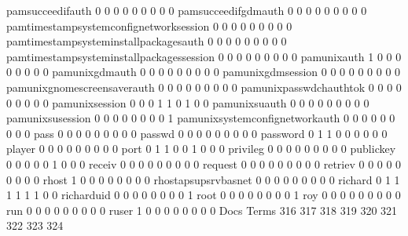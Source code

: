\documentclass[compress,8pt]{beamer}
\begin{document}
\begin{frame}
\begin{Schunk}
  pamsucceedifauth                           0   0   0   0   0   0   0   0   0
  pamsucceedifgdmauth                        0   0   0   0   0   0   0   0   0
  pamtimestampsystemconfignetworksession     0   0   0   0   0   0   0   0   0
  pamtimestampsysteminstallpackagesauth      0   0   0   0   0   0   0   0   0
  pamtimestampsysteminstallpackagessession   0   0   0   0   0   0   0   0   0
  pamunixauth                                1   0   0   0   0   0   0   0   0
  pamunixgdmauth                             0   0   0   0   0   0   0   0   0
  pamunixgdmsession                          0   0   0   0   0   0   0   0   0
  pamunixgnomescreensaverauth                0   0   0   0   0   0   0   0   0
  pamunixpasswdchauthtok                     0   0   0   0   0   0   0   0   0
  pamunixsession                             0   0   0   1   1   0   1   0   0
  pamunixsuauth                              0   0   0   0   0   0   0   0   0
  pamunixsusession                           0   0   0   0   0   0   0   0   1
  pamunixsystemconfignetworkauth             0   0   0   0   0   0   0   0   0
  pass                                       0   0   0   0   0   0   0   0   0
  passwd                                     0   0   0   0   0   0   0   0   0
  password                                   0   1   1   0   0   0   0   0   0
  player                                     0   0   0   0   0   0   0   0   0
  port                                       0   1   1   0   0   1   0   0   0
  privileg                                   0   0   0   0   0   0   0   0   0
  publickey                                  0   0   0   0   0   1   0   0   0
  receiv                                     0   0   0   0   0   0   0   0   0
  request                                    0   0   0   0   0   0   0   0   0
  retriev                                    0   0   0   0   0   0   0   0   0
  rhost                                      1   0   0   0   0   0   0   0   0
  rhostapsupsrvbasnet                        0   0   0   0   0   0   0   0   0
  richard                                    0   1   1   1   1   1   1   0   0
  richarduid                                 0   0   0   0   0   0   0   0   1
  root                                       0   0   0   0   0   0   0   0   1
  roy                                        0   0   0   0   0   0   0   0   0
  run                                        0   0   0   0   0   0   0   0   0
  ruser                                      1   0   0   0   0   0   0   0   0
                                          Docs
Terms                                      316 317 318 319 320 321 322 323 324

\end{Schunk}
\end{frame}
\end{document}
